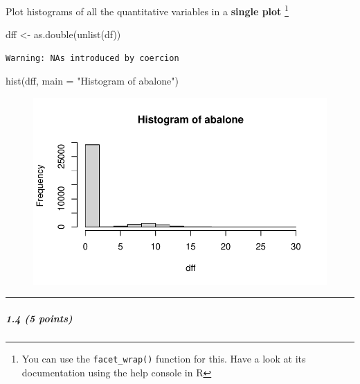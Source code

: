 \documentclass[
  letterpaper,
  DIV=11,
  numbers=noendperiod]{scrartcl}
\let\oldsubparagraph\subparagraph
\renewcommand{\subparagraph}[1]{\oldsubparagraph{#1}\mbox{}}
\newenvironment{Shaded}{\begin{snugshade}}{\end{snugshade}}
\newcommand{\AttributeTok}[1]{\textcolor[rgb]{0.40,0.45,0.13}{#1}}
\newcommand{\FunctionTok}[1]{\textcolor[rgb]{0.28,0.35,0.67}{#1}}
\newcommand{\NormalTok}[1]{\textcolor[rgb]{0.00,0.23,0.31}{#1}}
\newcommand{\OtherTok}[1]{\textcolor[rgb]{0.00,0.23,0.31}{#1}}
\newcommand{\StringTok}[1]{\textcolor[rgb]{0.13,0.47,0.30}{#1}}
\begin{document}
Plot histograms of all the quantitative variables in a \textbf{single
plot} \footnote{You can use the \texttt{facet\_wrap()} function for
  this. Have a look at its documentation using the help console in R}

\begin{Shaded}
\begin{Highlighting}[]
\NormalTok{dff }\OtherTok{\textless{}{-}} \FunctionTok{as.double}\NormalTok{(}\FunctionTok{unlist}\NormalTok{(df))}
\end{Highlighting}
\end{Shaded}

\begin{verbatim}
Warning: NAs introduced by coercion
\end{verbatim}

\begin{Shaded}
\begin{Highlighting}[]
\FunctionTok{hist}\NormalTok{(dff, }\AttributeTok{main =} \StringTok{"Histogram of abalone"}\NormalTok{)}
\end{Highlighting}
\end{Shaded}

\begin{figure}[H]

{\centering \includegraphics{hw2_files/figure-pdf/unnamed-chunk-4-1.pdf}

}

\end{figure}

\begin{center}\rule{0.5\linewidth}{0.5pt}\end{center}

\hypertarget{points-4}{%
\subparagraph{1.4 (5 points)}\label{points-4}}
\end{document}
